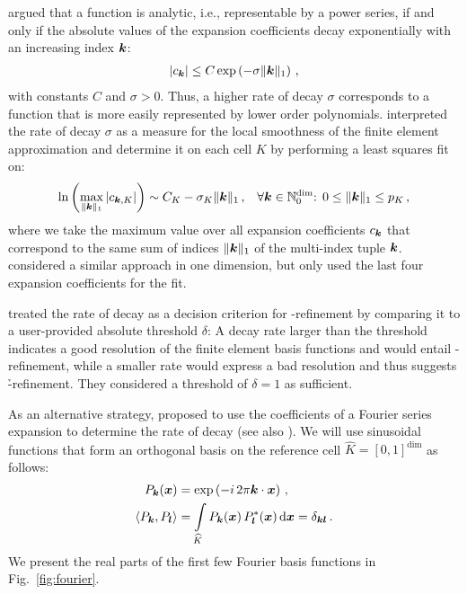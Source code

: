 \textcite[Prop.~2]{eibner2007} argued that a function is analytic, i.e., representable by a power series, if and only if the absolute values of the expansion coefficients decay exponentially with an increasing index $\tuple{k}$:
\begin{align}
|c_\tuple{k}| \leq C \exp\left( - \sigma \|\tuple{k}\|_1\right) \,\text{,}
\end{align}
with constants $C$ and $\sigma > 0$. Thus, a higher rate of decay $\sigma$ corresponds to a function that is more easily represented by lower order polynomials. \textcites[Sec.~2.4]{houston2005}[Ch.~4]{eibner2007} interpreted the rate of decay $\sigma$ as a measure for the local smoothness of the finite element approximation and determine it on each cell $K$ by performing a least squares fit on:
\begin{align}
\ln \left( \max\limits_{\|\tuple{k}\|_1} |c_{\tuple{k},K}| \right) \sim C_K - \sigma_K \|\tuple{k}\|_1 \,\text{,} \quad \forall \tuple{k} \in \mathbb{N}_0^\text{dim} \text{: } 0 \leq \|\tuple{k}\|_1 \leq p_K \,\text{,}
\end{align}
where we take the maximum value over all expansion coefficients $c_\tuple{k}$ that correspond to the same sum of indices $\|\tuple{k}\|_1$ of the multi-index tuple $\tuple{k}$. \textcite{mavriplis1994} considered a similar approach in one dimension, but only used the last four expansion coefficients for the fit.

\textcite{mavriplis1994, eibner2007} treated the rate of decay as a decision criterion for \hp-refinement by comparing it to a user-provided absolute threshold $\delta$: A decay rate larger than the threshold indicates a good resolution of the finite element basis functions and would entail \p-refinement, while a smaller rate would express a bad resolution and thus suggests \h-refinement. They considered a threshold of $\delta = 1$ as sufficient.

As an alternative strategy, \textcite{bangerth2009} proposed to use the coefficients of a Fourier series expansion to determine the rate of decay (see also \textcite{dealiistep-27}). We will use sinusoidal functions that form an orthogonal basis on the reference cell $\widehat{K} = [0,1]^\text{dim}$ as follows:
\begin{align}
P_\tuple{k}(\vec{x}) &= \exp\left(- i \, 2\pi \tuple{k} \cdot \vec{x}\right) \,\text{,} \\
\langle P_\tuple{k}, P_\tuple{l} \rangle &= \int\limits_{\widehat{K}} P_\tuple{k}(\vec{x}) \, P_\tuple{l}^\ast(\vec{x}) \differential{\vec{x}} = \delta_{\tuple{k} \tuple{l}} \,\text{.}
\end{align}
We present the real parts of the first few Fourier basis functions in Fig.~\ref{fig:fourier}.


